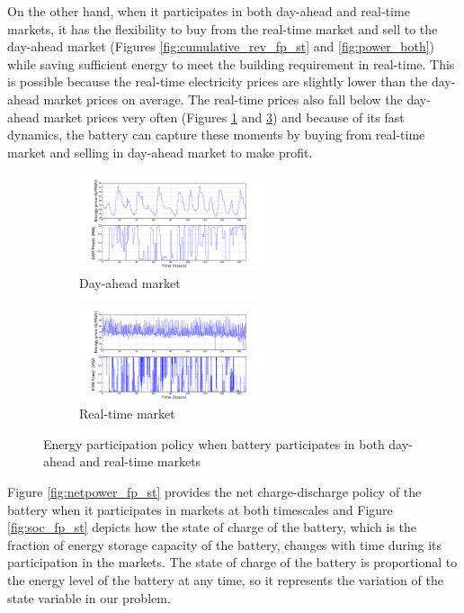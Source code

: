 \documentclass[11pt,twoside]{article}
\begin{document}
\FloatBarrier
On the other hand, when it participates in both day-ahead and real-time markets, it has the flexibility to buy from the real-time market and sell to the day-ahead market (Figures \ref{fig:cumulative_rev_fp_st} and \ref{fig:power_both}) while saving sufficient energy to meet the building requirement in real-time. This is possible because the real-time electricity prices are slightly lower than the day-ahead market prices on average. The real-time prices also fall below the day-ahead market prices very often (Figures \ref{fig:Pdam_fp_st} and \ref{fig:Prtm_fp_st}) and because of its fast dynamics, the battery can capture these moments by buying from real-time market and selling in day-ahead market to make profit. 
\begin{figure}[h!]\label{fig:power_both}
\begin{subfigure}{\textwidth}
\centering
\includegraphics[width=0.6\textwidth]{Figures/Plots/fullproblem_stoch/Pdam_fp_st.pdf} \caption{Day-ahead market}\label{fig:Pdam_fp_st}
\end{subfigure}
\begin{subfigure}{\textwidth}
\centering
\includegraphics[width=0.6\textwidth]{Figures/Plots/fullproblem_stoch/Prtm_fp_st.pdf} \caption{Real-time market}\label{fig:Prtm_fp_st}
\end{subfigure}
\caption{Energy participation policy when battery participates in both day-ahead and real-time markets}
\end{figure}
\FloatBarrier
Figure \ref{fig:netpower_fp_st} provides the net charge-discharge policy of the battery when it participates in markets at both timescales and Figure \ref{fig:soc_fp_st} depicts how the state of charge of the battery, which is the fraction of energy storage capacity of the battery, changes with time during its participation in the markets. The state of charge of the battery is proportional to the energy level of the battery at any time, so it represents the variation of the state variable in our problem.
\end{document}
